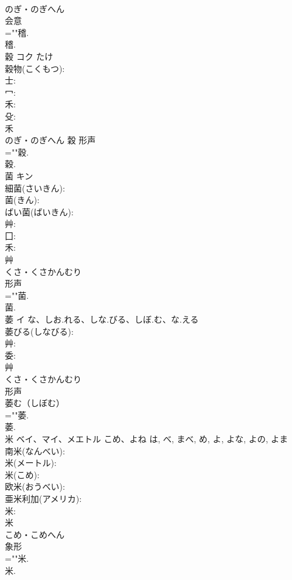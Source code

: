 \documentclass[8pt]{extreport}
\begin{document}
\begin{CJK}{UTF8}{min}
\\	のぎ・のぎへん	
\\	会意 
\\	=""稽.
\\	稽.
\\	穀	コク		たけ	
\\	穀物(こくもつ): 
\\	士: 
\\	冖: 
\\	禾: 
\\	殳: 
\\	禾	
\\	のぎ・のぎへん	穀	形声 
\\	=""穀.
\\	穀.
\\	菌	キン			
\\	細菌(さいきん): 
\\	菌(きん): 
\\	ばい菌(ばいきん): 
\\	艸: 
\\	囗: 
\\	禾: 
\\	艸	
\\	くさ・くさかんむり	
\\	形声 
\\	=""菌.
\\	菌.
\\	萎	イ	な、しお.れる、しな.びる、しぼ.む、な.える		
\\	萎びる(しなびる): 
\\	艸: 
\\	委: 
\\	艸	
\\	くさ・くさかんむり	
\\	形声 
\\	萎む（しぼむ）
\\	=""萎.
\\	萎.
\\	米	ベイ、マイ、メエトル	こめ、よね	は, べ, まべ, め, よ, よな, よの, よま	
\\	南米(なんべい): 
\\	米(メートル): 
\\	米(こめ): 
\\	欧米(おうべい): 
\\	亜米利加(アメリカ): 
\\	米: 
\\	米	
\\	こめ・こめへん	
\\	象形 
\\	=""米.
\\	米.

\end{CJK}
\end{document}
